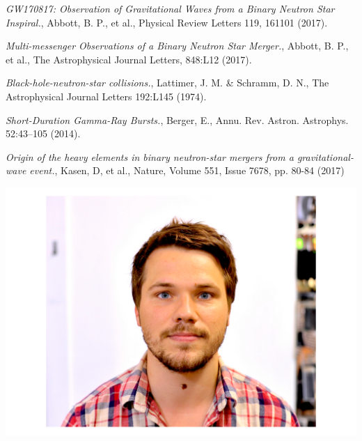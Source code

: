 \documentclass[twocolumn]{article}
\begin{document}
\begin{thebibliography}{9}
 \emph{GW170817: Observation of Gravitational Waves from a Binary Neutron Star Inspiral.},
Abbott, B. P., et al., Physical Review Letters 119, 161101 (2017).

 \emph{Multi-messenger Observations of a Binary Neutron Star Merger.},
Abbott, B. P., et al., The Astrophysical Journal Letters, 848:L12 (2017).

 \emph{Black-hole-neutron-star collisions.},
Lattimer, J. M. \& Schramm, D. N., The Astrophysical Journal Letters 192:L145 (1974).

 \emph{Short-Duration Gamma-Ray Bursts.},
Berger, E., Annu. Rev. Astron. Astrophys. 52:43–105 (2014).

 \emph{Origin of the heavy elements in binary neutron-star
mergers from a gravitational-wave event.},
Kasen, D, et al., Nature, Volume 551, Issue 7678, pp. 80-84 (2017)

\end{thebibliography}

\begin{center}
\includegraphics[width=0.8 \columnwidth]{me.pdf}
\end{center}
\end{document}
